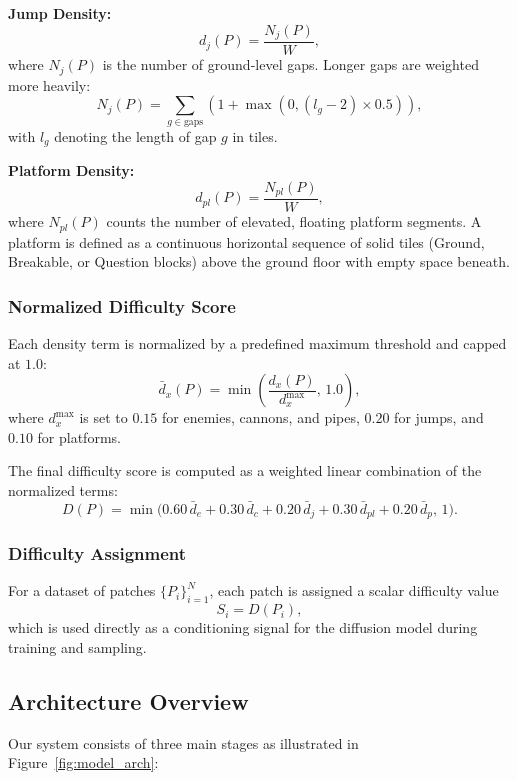 \documentclass[conference]{IEEEtran}
\begin{document}
\textbf{Jump Density:}
\begin{equation}
d_j(P) = \frac{N_j(P)}{W},
\end{equation}
where $N_j(P)$ is the number of ground-level gaps. Longer gaps are weighted more heavily:
\begin{equation}
N_j(P) = \sum_{g \in \text{gaps}}
\left(
1 + \max\left(0, (l_g - 2) \times 0.5\right)
\right),
\end{equation}
with $l_g$ denoting the length of gap $g$ in tiles.

\textbf{Platform Density:}
\begin{equation}
d_{pl}(P) = \frac{N_{pl}(P)}{W},
\end{equation}
where $N_{pl}(P)$ counts the number of elevated, floating platform segments. A platform is defined as a continuous horizontal sequence of solid tiles (Ground, Breakable, or Question blocks) above the ground floor with empty space beneath.

\subsubsection{Normalized Difficulty Score}
Each density term is normalized by a predefined maximum threshold and capped at $1.0$:
\[
\bar{d}_x(P) = \min\left(\frac{d_x(P)}{d_x^{\max}},\,1.0\right),
\]
where $d_x^{\max}$ is set to $0.15$ for enemies, cannons, and pipes, $0.20$ for jumps, and $0.10$ for platforms.

The final difficulty score is computed as a weighted linear combination of the normalized terms:
\begin{equation}
D(P) = \min\!\Big(
0.60\,\bar{d}_e +
0.30\,\bar{d}_c +
0.20\,\bar{d}_j +
0.30\,\bar{d}_{pl} +
0.20\,\bar{d}_p,\,
1
\Big).
\end{equation}

\subsubsection{Difficulty Assignment}
For a dataset of patches $\{P_i\}_{i=1}^{N}$, each patch is assigned a scalar difficulty value
\begin{equation}
S_i = D(P_i),
\end{equation}
which is used directly as a conditioning signal for the diffusion model during training and sampling.

\subsection{Architecture Overview}
Our system consists of three main stages as illustrated in Figure~\ref{fig:model_arch}:
\end{document}
